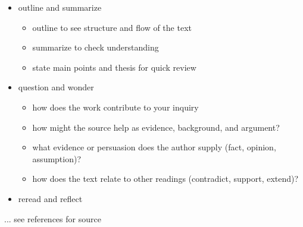 \begin{frame}
\begin{itemize}\setlength\itemsep{1em}
\item outline and summarize\medskip
\begin{itemize}\setlength\itemsep{1em}
\item outline to see structure and flow of the text
\item summarize to check understanding
\item state main points and thesis for quick review
\end{itemize}
\end{itemize}
\end{frame}
\begin{frame}
\begin{itemize}\setlength\itemsep{1em}
\item question and wonder\medskip
\begin{itemize}\setlength\itemsep{1em}
\item how does the work contribute to your inquiry
\item how might the source help as evidence, background, and argument?
\item what evidence or persuasion does the author supply (fact, opinion, assumption)?
\item how does the text relate to other readings (contradict, support, extend)?
\end{itemize}
\end{itemize}

\end{frame}
\begin{frame}
\begin{itemize}
\item reread and reflect
\end{itemize}\vspace{0.5cm}
... see references for source\nocite{CUBoulder.2018}
\end{frame}
